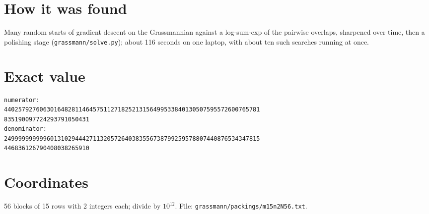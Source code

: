 \documentclass[11pt,a4paper]{article}
\begin{document}
\section{How it was found}
Many random starts of gradient descent on the Grassmannian against a log-sum-exp of the pairwise overlaps, sharpened over time, then a polishing stage (\texttt{grassmann/solve.py}); about 116 seconds on one laptop, with about ten such searches running at once.


\appendix
\section{Exact value}
{\small
\begin{verbatim}
numerator:
440257927606301648281146457511271825213156499533840130507595572600765781
835190097724293791050431
denominator:
249999999999601310294442711320572640383556738799259578807440876534347815
446836126790408038265910
\end{verbatim}}

\section{Coordinates}
56 blocks of 15 rows with 2 integers each; divide by $10^{12}$. File: \texttt{grassmann/packings/m15n2N56.txt}.
{\tiny
\begin{multicols}{4}
\end{multicols}}
\end{document}
